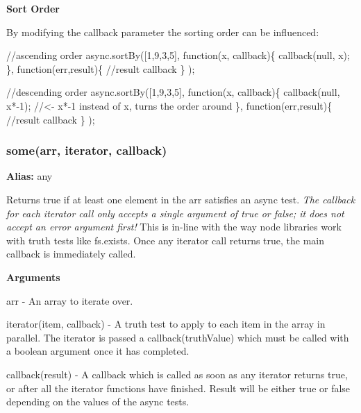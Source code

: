 {\bfseries Sort Order}

By modifying the callback parameter the sorting order can be influenced\+:


\begin{DoxyCode}
\textcolor{comment}{//ascending order}
async.sortBy([1,9,3,5], \textcolor{keyword}{function}(x, callback)\{
    callback(null, x);
\}, \textcolor{keyword}{function}(err,result)\{
    \textcolor{comment}{//result callback}
\} );

\textcolor{comment}{//descending order}
async.sortBy([1,9,3,5], \textcolor{keyword}{function}(x, callback)\{
    callback(null, x*-1);    \textcolor{comment}{//<- x*-1 instead of x, turns the order around}
\}, \textcolor{keyword}{function}(err,result)\{
    \textcolor{comment}{//result callback}
\} );
\end{DoxyCode}
 



\label{_some}%
 \subsubsection*{some(arr, iterator, callback)}

{\bfseries Alias\+:} {\ttfamily any}

Returns {\ttfamily true} if at least one element in the {\ttfamily arr} satisfies an async test. {\itshape The callback for each iterator call only accepts a single argument of {\ttfamily true} or {\ttfamily false}; it does not accept an error argument first!} This is in-\/line with the way node libraries work with truth tests like {\ttfamily fs.\+exists}. Once any iterator call returns {\ttfamily true}, the main {\ttfamily callback} is immediately called.

{\bfseries Arguments}


\begin{DoxyItemize}
\item {\ttfamily arr} -\/ An array to iterate over.
\item {\ttfamily iterator(item, callback)} -\/ A truth test to apply to each item in the array in parallel. The iterator is passed a callback(truth\+Value) which must be called with a boolean argument once it has completed.
\item {\ttfamily callback(result)} -\/ A callback which is called as soon as any iterator returns {\ttfamily true}, or after all the iterator functions have finished. Result will be either {\ttfamily true} or {\ttfamily false} depending on the values of the async tests.
\end{DoxyItemize}

